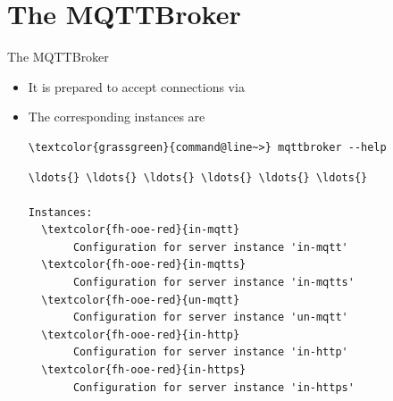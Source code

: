 ﻿\section[withsectionpage]{The MQTTBroker}

\begin{frame}[fragile]{The MQTTBroker}
\begin{itemize}
\item It is prepared to accept connections via
\item The corresponding instances are
\begin{scriptsize}
\begin{Verbatim}[commandchars=\\\{\}]
\textcolor{grassgreen}{command@line~>} mqttbroker --help
\end{Verbatim}
\begin{Verbatim}[commandchars=\\\{\},frame=leftline,rulecolor=\color{fh-ooe-red}]
\ldots{} \ldots{} \ldots{} \ldots{} \ldots{} \ldots{}

Instances:
  \textcolor{fh-ooe-red}{in-mqtt}
       Configuration for server instance 'in-mqtt'
  \textcolor{fh-ooe-red}{in-mqtts}
       Configuration for server instance 'in-mqtts'
  \textcolor{fh-ooe-red}{un-mqtt}
       Configuration for server instance 'un-mqtt'
  \textcolor{fh-ooe-red}{in-http}
       Configuration for server instance 'in-http'
  \textcolor{fh-ooe-red}{in-https}
       Configuration for server instance 'in-https'
\end{Verbatim}
\end{scriptsize}
\end{itemize}
\end{frame}
